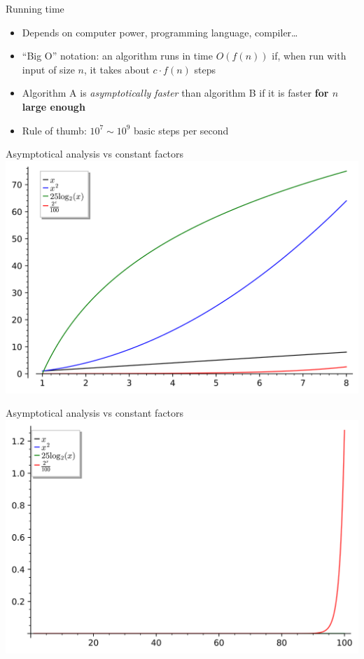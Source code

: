\documentclass[11pt]{beamer}
\begin{document}
\begin{frame}{Running time}
	\begin{itemize}
		\item Depends on computer power, programming language, compiler\dots
		\item ``Big O'' notation: an algorithm runs in time $O(f(n))$ if, when
		      run with input of size $n$, it takes about $c\cdot f(n)$ steps
		\item Algorithm A is \emph{asymptotically faster} than algorithm B if
		      it is faster \textbf{for $n$ large enough}
		\item Rule of thumb: $10^7\sim10^9$ basic steps per second
	\end{itemize}
\end{frame}

\begin{frame}{Asymptotical analysis vs constant factors}
	\includegraphics[scale=0.7]{img/plot1.png}
\end{frame}

\begin{frame}{Asymptotical analysis vs constant factors}
	\includegraphics[scale=0.7]{img/plot2.png}
\end{frame}
\end{document}
